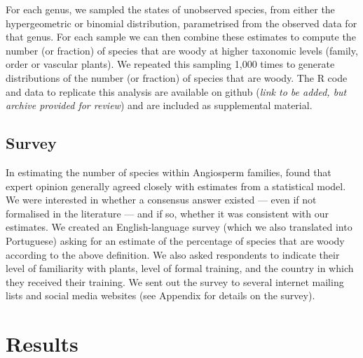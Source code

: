 \documentclass[a4paper,12pt]{article}
\begin{document}
For each genus, we sampled the states of unobserved species, from
either the hypergeometric or binomial distribution, parametrised from
the observed data for that genus.
%
For each sample we can then combine these estimates to compute the
number (or fraction) of species that are woody at higher taxonomic
levels (family, order or vascular plants).  We repeated this sampling
1,000 times to generate distributions of the number (or fraction) of
species that are woody.
%
The R code and data to replicate this analysis are available on github
(\textit{link to be added, but archive provided for review}) and are included
as supplemental material.

\subsection{Survey}

%
In estimating the number of species within Angiosperm families,
\citet{joppa2010} found that expert opinion generally agreed closely
with estimates from a statistical model.  We were interested in
whether a consensus answer existed --- even if not formalised in the
literature --- and if so, whether it was consistent with our
estimates.
% 
We created an English-language survey (which we also translated into
Portuguese) asking for an estimate of the percentage of species that
are woody according to the above definition.  We also asked
respondents to indicate their level of familiarity with plants, level
of formal training, and the country in which they received their
training. We sent out the survey to several internet mailing lists and
social media websites (see Appendix for details on the
survey).

\section{Results}
\end{document}
